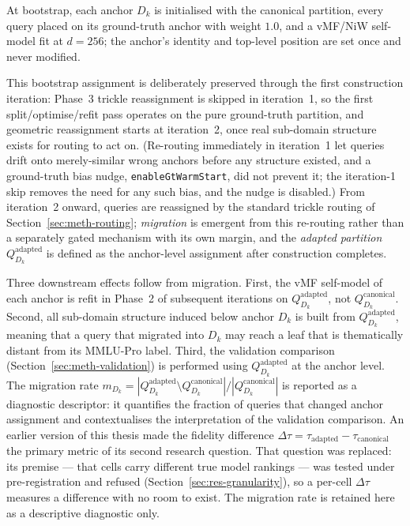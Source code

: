 At bootstrap, each anchor $D_k$ is initialised with the canonical
partition, every query placed on its ground-truth anchor with weight
$1.0$, and a vMF/NiW self-model fit at $d = 256$; the anchor's
identity and top-level position are set once and never modified.

This bootstrap assignment is deliberately preserved through the first
construction iteration: Phase~3 trickle reassignment is skipped in
iteration~1, so the first split/optimise/refit pass operates on the
pure ground-truth partition, and geometric reassignment starts at
iteration~2, once real sub-domain structure exists for routing to act
on.
(Re-routing immediately in iteration~1 let queries drift onto
merely-similar wrong anchors before any structure existed, and a
ground-truth bias nudge, \texttt{enableGtWarmStart}, did not prevent
it; the iteration-1 skip removes the need for any such bias, and the
nudge is disabled.)
From iteration~2 onward, queries are reassigned by the standard
trickle routing of Section~\ref{sec:meth-routing};
\textit{migration} is emergent from this re-routing rather than a
separately gated mechanism with its own margin, and the
\textit{adapted partition} $Q_{D_k}^{\text{adapted}}$ is defined as
the anchor-level assignment after construction completes.

Three downstream effects follow from migration.
First, the vMF self-model of each anchor is refit in Phase~2 of
subsequent iterations on $Q_{D_k}^{\text{adapted}}$, not
$Q_{D_k}^{\text{canonical}}$.
Second, all sub-domain structure induced below anchor $D_k$ is built
from $Q_{D_k}^{\text{adapted}}$, meaning that a query that migrated
into $D_k$ may reach a leaf that is thematically distant from its
MMLU-Pro label.
Third, the validation comparison (Section~\ref{sec:meth-validation})
is performed using $Q_{D_k}^{\text{adapted}}$ at the anchor level.
The migration rate
$m_{D_k} = |Q_{D_k}^{\text{adapted}} \setminus
Q_{D_k}^{\text{canonical}}| / |Q_{D_k}^{\text{canonical}}|$ is
reported as a diagnostic descriptor: it quantifies the fraction of
queries that changed anchor assignment and contextualises the
interpretation of the validation comparison.
An earlier version of this thesis made the fidelity difference
$\Delta\tau = \tau_{\text{adapted}} - \tau_{\text{canonical}}$ the
primary metric of its second research question. That question was
replaced: its premise --- that cells carry different true model
rankings --- was tested under pre-registration and refused
(Section~\ref{sec:res-granularity}), so a per-cell $\Delta\tau$
measures a difference with no room to exist. The migration rate is
retained here as a descriptive diagnostic only.

